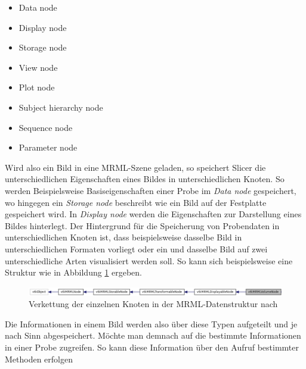 \begin{minipage}{0.45\textwidth}
	\begin{itemize}
		\item Data node

		\item Display node

		\item Storage node

		\item View node
	\end{itemize}
\end{minipage}
\hfill
\begin{minipage}{0.45\textwidth}
	\begin{itemize}
		\item Plot node

		\item Subject hierarchy node

		\item Sequence node

		\item Parameter node
	\end{itemize}
\end{minipage}

Wird also ein Bild in eine \ac{MRML}-Szene geladen, so speichert Slicer die unterschiedlichen
Eigenschaften eines Bildes in unterschiedlichen Knoten. So werden Beispielsweise
Basiseigenschaften einer Probe im \textit{Data node} gespeichert, wo hingegen
ein \textit{Storage node} beschreibt wie ein Bild auf der Festplatte gespeichert
wird. In \textit{Display node} werden die Eigenschaften zur Darstellung eines Bildes
hinterlegt. Der Hintergrund für die Speicherung von Probendaten in
unterschiedlichen Knoten ist, dass beispielsweise dasselbe Bild in unterschiedlichen
Formaten vorliegt oder ein und dasselbe Bild auf zwei unterschiedliche Arten visualisiert
werden soll. So kann sich beispielsweise eine Struktur wie in Abbildung
\ref{fig:3d_slicer_class} ergeben.

\begin{figure}[h]
	\centering
	\includegraphics[width=1\textwidth]{img/slicer_class_index.jpg}
	\caption{Verkettung der einzelnen Knoten in der MRML-Datenstruktur nach
	\cite{slicer2024}}
	\label{fig:3d_slicer_class}
\end{figure}

Die Informationen in einem Bild werden also über diese Typen aufgeteilt und je nach
Sinn abgespeichert. Möchte man demnach auf die bestimmte Informationen in einer
Probe zugreifen. So kann diese Information über den Aufruf bestimmter Methoden erfolgen

